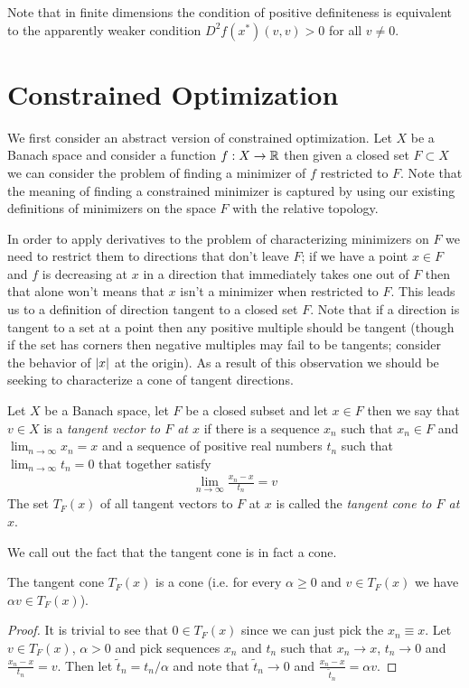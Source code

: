 Note that in finite dimensions the condition of positive definiteness
is equivalent to the apparently weaker condition $D^2f(x^*) (v,v) > 0$
for all $v \neq 0$.

\section{Constrained Optimization}

We first consider an abstract version of constrained
optimization.  Let $X$ be a Banach space and consider a function $f :
X \to \mathbb{R}$ then given a closed set $F \subset X$ we can consider
the problem of finding a minimizer of $f$ restricted to $F$.  Note
that the meaning of finding a constrained minimizer is captured by
using our existing definitions of minimizers on the space $F$ with the
relative topology.

In order
to apply derivatives to the problem of characterizing minimizers on
$F$ we need to restrict them to directions that don't leave $F$;
if we have a point $x \in F$ and $f$ is decreasing at $x$ in a direction that immediately takes one out of
$F$ then that alone won't means that $x$ isn't a minimizer when
restricted to $F$.  This leads us to a definition of direction tangent
to a closed set $F$.  Note that if a direction is tangent to a set at
a point then any positive multiple should be tangent (though if the
set has corners then negative multiples may fail to be tangents;
consider the behavior of $\left \vert x \right \vert$ at the origin).  As a result of
this observation we should be seeking to characterize a cone of
tangent directions.  
\begin{defn}Let $X$ be a Banach space, let $F$ be a closed subset and
  let $x \in F$ then we say that $v \in X$ is a \emph{tangent vector to $F$
  at $x$} if there is a sequence $x_n$ such that $x_n \in F$ and
  $\lim_{n \to \infty} x_n = x$ and a sequence of positive real numbers
  $t_n$ such that $\lim_{n \to \infty} t_n = 0$ that together satisfy
\begin{align*}
\lim_{n \to \infty} \frac{x_n - x}{t_n} = v
\end{align*}
The set $T_F(x)$ of all tangent vectors to $F$ at $x$ is called the
\emph{tangent cone to $F$ at $x$}.
\end{defn}

We call out the fact that the tangent cone is in fact a cone.
\begin{prop}The tangent cone $T_F(x)$ is a cone (i.e. for every
  $\alpha \geq 0$ and $v \in T_F(x)$ we have $\alpha v \in T_F(x)$).
\end{prop}
\begin{proof}
It is trivial to see that $0 \in T_F(x)$ since we can just pick the
$x_n \equiv x$.  Let $v \in T_F(x)$, $\alpha > 0$ and pick sequences $x_n$ and $t_n$ such that $x_n \to x$, $t_n \to 0$ and
$\frac{x_n - x}{t_n} = v$.  Then let $\tilde{t}_n = t_n/\alpha$ and note that
$\tilde{t}_n \to 0$ and $\frac{x_n -x}{\tilde{t}_n} = \alpha v$.
\end{proof}

